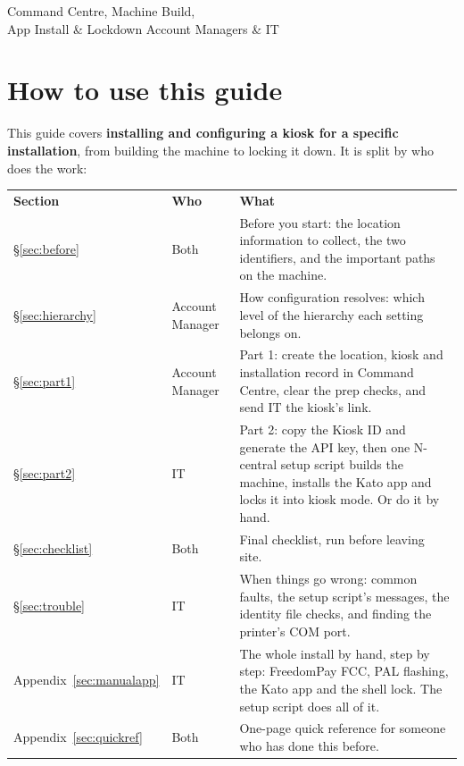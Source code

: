 \documentclass[a4paper,10pt]{article}
\begin{document}
             {Command Centre, Machine Build, \\App Install \& Lockdown}
             {Account Managers \& IT}

\section*{How to use this guide}

This guide covers \textbf{installing and configuring a kiosk for a specific
installation}, from building the machine to locking it down. It is split
by who does the work:

\begin{center}
\renewcommand{\arraystretch}{1.35}\small
\begin{tabularx}{\textwidth}{L{22mm} L{30mm} X}
\color{white}\textbf{Section} &
\color{white}\textbf{Who} & \color{white}\textbf{What}\\
\S\ref{sec:before} & Both &
Before you start: the location information to collect, the two
identifiers, and the important paths on the machine.\\
\S\ref{sec:hierarchy} & Account Manager &
How configuration resolves: which level of the hierarchy each setting
belongs on.\\
\S\ref{sec:part1} & Account Manager &
Part 1: create the location, kiosk and installation record in Command
Centre, clear the prep checks, and send IT the kiosk's link.\\
\S\ref{sec:part2} & IT &
Part 2: copy the Kiosk ID and generate the API key, then one N-central
setup script builds the machine, installs the Kato app and locks it into
kiosk mode. Or do it by hand.\\
\S\ref{sec:checklist} & Both &
Final checklist, run before leaving site.\\
\S\ref{sec:trouble} & IT &
When things go wrong: common faults, the setup script's messages, the
identity file checks, and finding the printer's COM port.\\
Appendix~\ref{sec:manualapp} & IT &
The whole install by hand, step by step: FreedomPay FCC, PAL flashing, the
Kato app and the shell lock. The setup script does all of it.\\
Appendix~\ref{sec:quickref} & Both &
One-page quick reference for someone who has done this before.\\
\end{tabularx}
\end{center}
\end{document}
